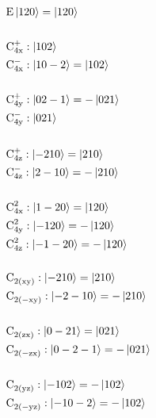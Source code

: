 \begin{minipage}[t]{0.33\linewidth}
  \begin{align*}
    &\ce{E}\ket{120} = \ket{120}  \\\\
    &\ce{C^{+}_{4x}}: \ket{102} \\
    &\ce{C^{-}_{4x}}: \ket{10-2}=\ket{102}  \\\\
    &\ce{C^{+}_{4y}}: \ket{02-1}= -\ket{021} \\
    &\ce{C^{-}_{4y}}: \ket{021} \\ \\
    &\ce{C^{+}_{4z}}: \ket{-210}= \ket{210} \\
    &\ce{C^{-}_{4z}}: \ket{2-10}= -\ket{210} \\ 
    \\
    &\ce{C^{2}_{4x}}: \ket{1-20}= \ket{120} \\
    &\ce{C^{2}_{4y}}: \ket{-120}= -\ket{120} \\
    &\ce{C^{2}_{4z}}: \ket{-1-20}= -\ket{120} \\ \\
    &\ce{C_{2(xy)}}: \ket{-210}= \ket{210} \\
    &\ce{C_{2(-xy)}}: \ket{-2-10}= -\ket{210} \\ \\
    &\ce{C_{2(zx)}}: \ket{0-21}= \ket{021} \\
    &\ce{C_{2(-zx)}}: \ket{0-2-1}= -\ket{021} \\ \\
    &\ce{C_{2(yz)}}: \ket{-102}= -\ket{102} \\
    &\ce{C_{2(-yz)}}: \ket{-10-2}= -\ket{102} 
  \end{align*}
\end{minipage}%
